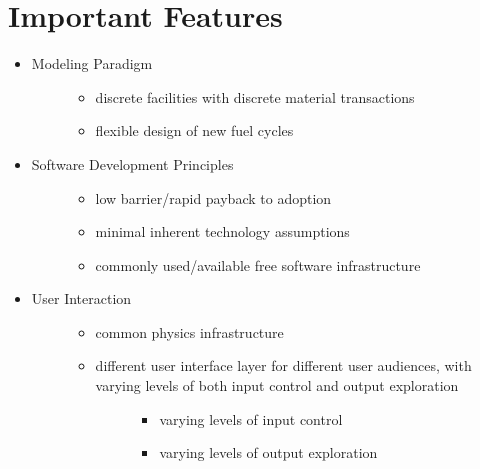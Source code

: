 \documentclass[letterpaper,10pt,english]{sphinxmanual}
\begin{document}
\chapter{Important Features}
\label{index:important-features}\label{index:cyclus}\begin{itemize}
\item {} \begin{description}
\item[{Modeling Paradigm}] \leavevmode\begin{itemize}
\item {} 
discrete facilities with discrete material transactions

\item {} 
flexible design of new fuel cycles

\end{itemize}

\end{description}

\item {} \begin{description}
\item[{Software Development Principles}] \leavevmode\begin{itemize}
\item {} 
low barrier/rapid payback to adoption

\item {} 
minimal inherent technology assumptions

\item {} 
commonly used/available free software infrastructure

\end{itemize}

\end{description}

\item {} \begin{description}
\item[{User Interaction}] \leavevmode\begin{itemize}
\item {} 
common physics infrastructure

\item {} \begin{description}
\item[{different user interface layer for different user audiences, with varying levels of both input control and output exploration}] \leavevmode\begin{itemize}
\item {} 
varying levels of input control

\item {} 
varying levels of output exploration

\end{itemize}

\end{description}

\end{itemize}

\end{description}

\end{itemize}
\end{document}
